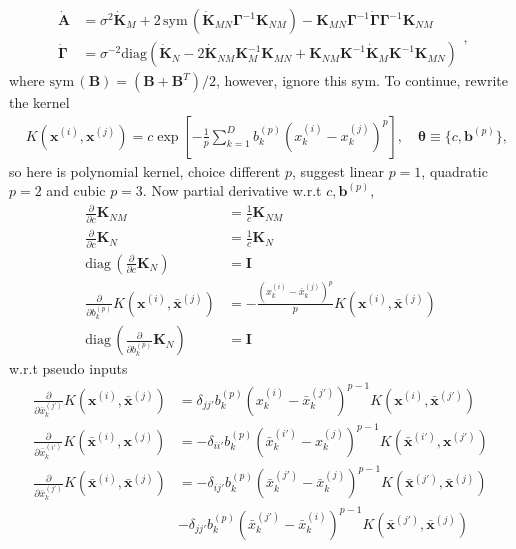 \documentclass[10pt,a4paper]{article}
\begin{document}
\begin{equation}
\begin{split}
\dot{\pmb{A}}&=\sigma^2\dot{\pmb{K}}_M+2\,\mathrm{sym}\,(\dot{\pmb{K}}_{MN}\pmb{\Gamma}^{-1}\pmb{K}_{NM})-\pmb{K}_{MN}\pmb{\Gamma}^{-1}\dot{\pmb{\Gamma}}\pmb{\Gamma}^{-1}\pmb{K}_{NM}\\
\dot{\pmb{\Gamma}}&=\sigma^{-2}\mathrm{diag}(\dot{\pmb{K}}_N-2\dot{\pmb{K}}_{NM}\pmb{K}^{-1}_M\pmb{K}_{MN}+\pmb{K}_{NM}\pmb{K}^{-1}\dot{\pmb{K}}_{M}\pmb{K}^{-1}\pmb{K}_{MN})
\end{split},
\end{equation}
where $\mathrm{sym}\,(\pmb{B})=(\pmb{B}+\pmb{B}^T)/2$, however, ignore this sym. To continue, rewrite the kernel
\begin{align}
&K(\pmb{x}^{(i)},\pmb{x}^{(j)})=c\exp [-\frac{1}{p}\sum_{k=1}^{D}b^{(p)}_k(x^{(i)}_k-x^{(j)}_k)^p], \quad\pmb{\theta}\equiv \lbrace c,\pmb{b}^{(p)}\rbrace,
\end{align}
so here is polynomial kernel, choice different $p$, suggest linear $p=1$, quadratic $p=2$ and cubic $p=3$. Now partial derivative w.r.t $c,\pmb{b}^{(p)}$,
\begin{align}
\frac{\partial}{\partial c}\pmb{K}_{NM}&=\frac{1}{c}\pmb{K}_{NM}\\
\frac{\partial}{\partial c}\pmb{K}_{N}&=\frac{1}{c}\pmb{K}_{N}\\
\mathrm{diag}\,(\frac{\partial}{\partial c}\pmb{K}_{N})&=\pmb{I}\\
\frac{\partial}{\partial b_k^{(p)}}K(\pmb{x}^{(i)},\bar{\pmb{x}}^{(j)})&=-\frac{(x_k^{(i)}-\bar{x}_k^{(j)})^p}{p}K(\pmb{x}^{(i)},\bar{\pmb{x}}^{(j)})\\
\mathrm{diag}\,(\frac{\partial}{\partial b_k^{(p)}}\pmb{K}_{N})&=\pmb{I}
\end{align}
w.r.t pseudo inputs
\begin{align}
\frac{\partial}{\partial \bar{x}_k^{(j')}}K(\pmb{x}^{(i)},\bar{\pmb{x}}^{(j)})&=\delta_{jj'}b_k^{(p)}(x_k^{(i)}-\bar{x}_k^{(j')})^{p-1}K(\pmb{x}^{(i)},\bar{\pmb{x}}^{(j')})\\
\frac{\partial}{\partial \bar{x}_k^{(i')}}K(\bar{\pmb{x}}^{(i)},\pmb{x}^{(j)})&=-\delta_{ii'}b_k^{(p)}(\bar{x}_k^{(i')}-x_k^{(j)})^{p-1}K(\bar{\pmb{x}}^{(i')},\pmb{x}^{(j')})\\
\frac{\partial}{\partial \bar{x}_k^{(j')}}K(\bar{\pmb{x}}^{(i)},\bar{\pmb{x}}^{(j)})&=-\delta_{ij'}b_k^{(p)}(\bar{x}_k^{(j')}-\bar{x}_k^{(j)})^{p-1}K(\bar{\pmb{x}}^{(j')},\bar{\pmb{x}}^{(j)})\\&-\delta_{jj'}b_k^{(p)}(\bar{x}_k^{(j')}-\bar{x}_k^{(i)})^{p-1}K(\bar{\pmb{x}}^{(j')},\bar{\pmb{x}}^{(j)})
\end{align}
\end{document}
